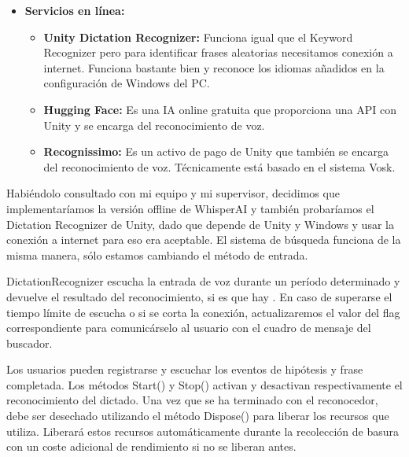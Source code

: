\begin{itemize}
   \item \textbf{Servicios en línea:}
   \begin{itemize}
      \item \textbf{Unity Dictation Recognizer:}
      Funciona igual que el Keyword Recognizer pero para identificar frases aleatorias necesitamos conexión a internet. Funciona bastante bien y reconoce los idiomas añadidos en la configuración de Windows del PC.
      \item \textbf{Hugging Face:}
      Es una IA online gratuita que proporciona una API con Unity y se encarga del reconocimiento de voz.
      \item \textbf{Recognissimo:}
      Es un activo de pago de Unity que también se encarga del reconocimiento de voz. Técnicamente está basado en el sistema Vosk.
   \end{itemize}
\end{itemize}

Habiéndolo consultado con mi equipo y mi supervisor, decidimos que implementaríamos la versión offline de WhisperAI y también probaríamos el Dictation Recognizer de Unity, dado que depende de Unity y Windows y usar la conexión a internet para eso era aceptable.
El sistema de búsqueda funciona de la misma manera, sólo estamos cambiando el método de entrada.

DictationRecognizer escucha la entrada de voz durante un período determinado y devuelve el resultado del reconocimiento, si es que hay \cite[]{DicationRecognizer}. En caso de superarse el tiempo límite de escucha o si se corta la conexión, actualizaremos el valor del flag correspondiente para comunicárselo al usuario con el cuadro de mensaje del buscador.

Los usuarios pueden registrarse y escuchar los eventos de hipótesis y frase completada. Los métodos Start() y Stop() activan y desactivan respectivamente el reconocimiento del dictado. Una vez que se ha terminado con el reconocedor, debe ser desechado utilizando el método Dispose() para liberar los recursos que utiliza. Liberará estos recursos automáticamente durante la recolección de basura con un coste adicional de rendimiento si no se liberan antes.



